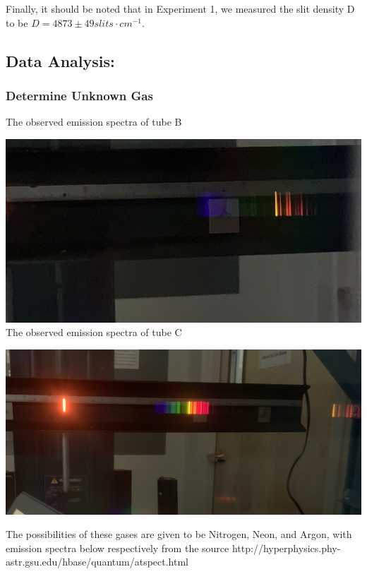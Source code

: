\documentclass[11pt]{article}
\makeatletter
\def\maxwidth{\ifdim\Gin@nat@width>\linewidth\linewidth
    \else\Gin@nat@width\fi}
\let\Oldincludegraphics\includegraphics
\renewcommand{\includegraphics}[1]{\Oldincludegraphics[width=.8\maxwidth]{#1}}
\makeatother
\begin{document}
Finally, it should be noted that in Experiment 1, we measured the slit
density D to be \(D = 4873\pm49 slits·cm^{-1}\).

    \hypertarget{data-analysis}{%
\subsection{Data Analysis:}\label{data-analysis}}

\hypertarget{determine-unknown-gas}{%
\subsubsection{Determine Unknown Gas}\label{determine-unknown-gas}}

The observed emission spectra of tube B 

\includegraphics{BNeon.jpg} \\

The observed emission spectra of tube C 

\includegraphics{CNitrogen.jpg}

The possibilities of these gases are given to be Nitrogen, Neon, and
Argon, with emission spectra below respectively from the source http://hyperphysics.phy-astr.gsu.edu/hbase/quantum/atspect.html
\end{document}
